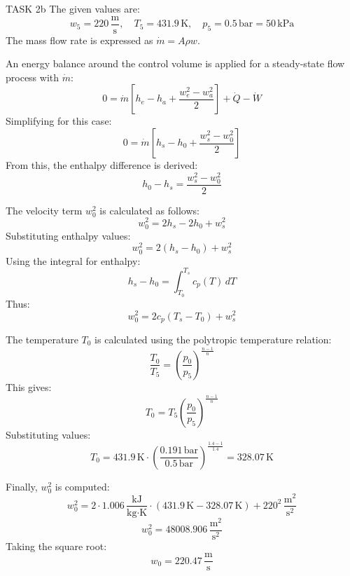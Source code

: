 TASK 2b  
The given values are:  
\[
w_5 = 220 \, \frac{\text{m}}{\text{s}}, \quad T_5 = 431.9 \, \text{K}, \quad p_5 = 0.5 \, \text{bar} = 50 \, \text{kPa}
\]  
The mass flow rate is expressed as \( \dot{m} = A \rho w \).

An energy balance around the control volume is applied for a steady-state flow process with \( \dot{m} \):  
\[
0 = \dot{m} \left[ h_e - h_a + \frac{w_e^2 - w_a^2}{2} \right] + \dot{Q} - \dot{W}
\]  
Simplifying for this case:  
\[
0 = \dot{m} \left[ h_s - h_0 + \frac{w_s^2 - w_0^2}{2} \right]
\]  
From this, the enthalpy difference is derived:  
\[
h_0 - h_s = \frac{w_s^2 - w_0^2}{2}
\]  

The velocity term \( w_0^2 \) is calculated as follows:  
\[
w_0^2 = 2 h_s - 2 h_0 + w_s^2
\]  
Substituting enthalpy values:  
\[
w_0^2 = 2 \left( h_s - h_0 \right) + w_s^2
\]  
Using the integral for enthalpy:  
\[
h_s - h_0 = \int_{T_0}^{T_s} c_p(T) \, dT
\]  
Thus:  
\[
w_0^2 = 2 c_p \left( T_s - T_0 \right) + w_s^2
\]  

The temperature \( T_0 \) is calculated using the polytropic temperature relation:  
\[
\frac{T_0}{T_5} = \left( \frac{p_0}{p_5} \right)^{\frac{n-1}{n}}
\]  
This gives:  
\[
T_0 = T_5 \left( \frac{p_0}{p_5} \right)^{\frac{n-1}{n}}
\]  
Substituting values:  
\[
T_0 = 431.9 \, \text{K} \cdot \left( \frac{0.191 \, \text{bar}}{0.5 \, \text{bar}} \right)^{\frac{1.4 - 1}{1.4}} = 328.07 \, \text{K}
\]  

Finally, \( w_0^2 \) is computed:  
\[
w_0^2 = 2 \cdot 1.006 \, \frac{\text{kJ}}{\text{kg·K}} \cdot (431.9 \, \text{K} - 328.07 \, \text{K}) + 220^2 \, \frac{\text{m}^2}{\text{s}^2}
\]  
\[
w_0^2 = 48008.906 \, \frac{\text{m}^2}{\text{s}^2}
\]  
Taking the square root:  
\[
w_0 = 220.47 \, \frac{\text{m}}{\text{s}}
\]  